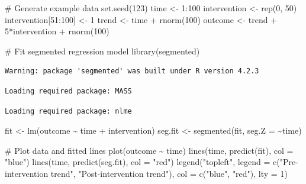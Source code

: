 \documentclass[
  letterpaper,
  DIV=11,
  numbers=noendperiod]{scrartcl}
\newenvironment{Shaded}{\begin{snugshade}}{\end{snugshade}}
\newcommand{\AttributeTok}[1]{\textcolor[rgb]{0.40,0.45,0.13}{#1}}
\newcommand{\CommentTok}[1]{\textcolor[rgb]{0.37,0.37,0.37}{#1}}
\newcommand{\DecValTok}[1]{\textcolor[rgb]{0.68,0.00,0.00}{#1}}
\newcommand{\FunctionTok}[1]{\textcolor[rgb]{0.28,0.35,0.67}{#1}}
\newcommand{\NormalTok}[1]{\textcolor[rgb]{0.00,0.23,0.31}{#1}}
\newcommand{\OtherTok}[1]{\textcolor[rgb]{0.00,0.23,0.31}{#1}}
\newcommand{\SpecialCharTok}[1]{\textcolor[rgb]{0.37,0.37,0.37}{#1}}
\newcommand{\StringTok}[1]{\textcolor[rgb]{0.13,0.47,0.30}{#1}}
\begin{document}
\begin{Shaded}
\begin{Highlighting}[]
\CommentTok{\# Generate example data}
\FunctionTok{set.seed}\NormalTok{(}\DecValTok{123}\NormalTok{)}
\NormalTok{time }\OtherTok{\textless{}{-}} \DecValTok{1}\SpecialCharTok{:}\DecValTok{100}
\NormalTok{intervention }\OtherTok{\textless{}{-}} \FunctionTok{rep}\NormalTok{(}\DecValTok{0}\NormalTok{, }\DecValTok{50}\NormalTok{)}
\NormalTok{intervention[}\DecValTok{51}\SpecialCharTok{:}\DecValTok{100}\NormalTok{] }\OtherTok{\textless{}{-}} \DecValTok{1}
\NormalTok{trend }\OtherTok{\textless{}{-}}\NormalTok{ time }\SpecialCharTok{+} \FunctionTok{rnorm}\NormalTok{(}\DecValTok{100}\NormalTok{)}
\NormalTok{outcome }\OtherTok{\textless{}{-}}\NormalTok{ trend }\SpecialCharTok{+} \DecValTok{5}\SpecialCharTok{*}\NormalTok{intervention }\SpecialCharTok{+} \FunctionTok{rnorm}\NormalTok{(}\DecValTok{100}\NormalTok{)}

\CommentTok{\# Fit segmented regression model}
\FunctionTok{library}\NormalTok{(segmented)}
\end{Highlighting}
\end{Shaded}

\begin{verbatim}
Warning: package 'segmented' was built under R version 4.2.3
\end{verbatim}

\begin{verbatim}
Loading required package: MASS
\end{verbatim}

\begin{verbatim}
Loading required package: nlme
\end{verbatim}

\begin{Shaded}
\begin{Highlighting}[]
\NormalTok{fit }\OtherTok{\textless{}{-}} \FunctionTok{lm}\NormalTok{(outcome }\SpecialCharTok{\textasciitilde{}}\NormalTok{ time }\SpecialCharTok{+}\NormalTok{ intervention)}
\NormalTok{seg.fit }\OtherTok{\textless{}{-}} \FunctionTok{segmented}\NormalTok{(fit, }\AttributeTok{seg.Z =} \SpecialCharTok{\textasciitilde{}}\NormalTok{time)}

\CommentTok{\# Plot data and fitted lines}
\FunctionTok{plot}\NormalTok{(outcome }\SpecialCharTok{\textasciitilde{}}\NormalTok{ time)}
\FunctionTok{lines}\NormalTok{(time, }\FunctionTok{predict}\NormalTok{(fit), }\AttributeTok{col =} \StringTok{"blue"}\NormalTok{)}
\FunctionTok{lines}\NormalTok{(time, }\FunctionTok{predict}\NormalTok{(seg.fit), }\AttributeTok{col =} \StringTok{"red"}\NormalTok{)}
\FunctionTok{legend}\NormalTok{(}\StringTok{"topleft"}\NormalTok{, }\AttributeTok{legend =} \FunctionTok{c}\NormalTok{(}\StringTok{"Pre{-}intervention trend"}\NormalTok{, }\StringTok{"Post{-}intervention trend"}\NormalTok{), }\AttributeTok{col =} \FunctionTok{c}\NormalTok{(}\StringTok{"blue"}\NormalTok{, }\StringTok{"red"}\NormalTok{), }\AttributeTok{lty =} \DecValTok{1}\NormalTok{)}
\end{Highlighting}
\end{Shaded}
\end{document}
